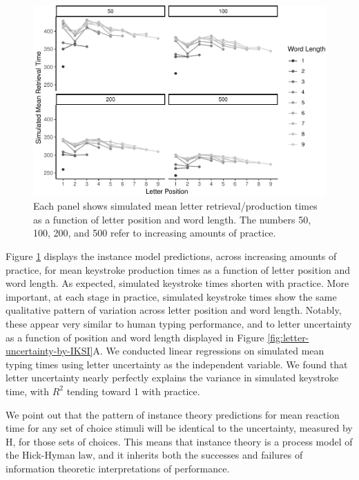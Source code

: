 \documentclass[,man,donotrepeattitle,floatsintext]{apa6}
\begin{document}
\begin{figure}
\centering
\includegraphics{Entropy_typing_draft_files/figure-latex/instance-model-1.pdf}
\caption{\label{fig:instance-model}Each panel shows simulated mean letter retrieval/production times as a function of letter position and word length. The numbers 50, 100, 200, and 500 refer to increasing amounts of practice.}
\end{figure}

Figure \ref{fig:instance-model} displays the instance model predictions, across increasing amounts of practice, for mean keystroke production times as a function of letter position and word length. As expected, simulated keystroke times shorten with practice. More important, at each stage in practice, simulated keystroke times show the same qualitative pattern of variation across letter position and word length. Notably, these appear very similar to human typing performance, and to letter uncertainty as a function of position and word length displayed in Figure \ref{fig:letter-uncertainty-by-IKSI}A. We conducted linear regressions on simulated mean typing times using letter uncertainty as the independent variable. We found that letter uncertainty nearly perfectly explains the variance in simulated keystroke time, with \(R^2\) tending toward 1 with practice.

We point out that the pattern of instance theory predictions for mean reaction time for any set of choice stimuli will be identical to the uncertainty, measured by H, for those sets of choices. This means that instance theory is a process model of the Hick-Hyman law, and it inherits both the successes and failures of information theoretic interpretations of performance.
\end{document}
